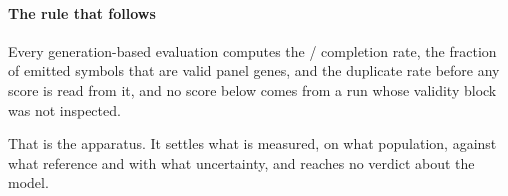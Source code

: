 \paragraph{The rule that follows} Every generation-based evaluation computes the
\ENDCELL{}/\DOWN{} completion rate, the fraction of emitted symbols that are
valid panel genes, and the duplicate rate before any score is read from it, and
no score below comes from a run whose validity block was not inspected.

That is the apparatus. It settles what is measured, on what population, against
what reference and with what uncertainty, and reaches no verdict about the
model.
